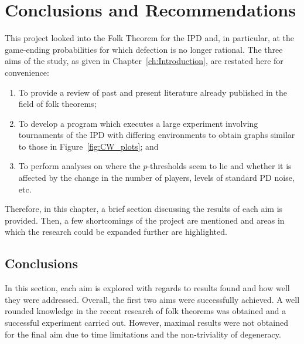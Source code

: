 \chapter{Conclusions and Recommendations}\label{ch:Conclusions}
This project looked into the Folk Theorem for the IPD and, in particular, at the
game-ending probabilities for which defection is no longer rational. The three
aims of the study, as given in Chapter~\ref{ch:Introduction}, are restated here for
convenience:

\begin{enumerate}
    \item To provide a review of past and present literature already published in
    the field of folk theorems;
    
    \item To develop a program which executes a large experiment involving
    tournaments of the IPD with differing environments to obtain
    graphs similar to those in Figure~\ref{fig:CW_plots}; and
    
    \item To perform analyses on where the \(p\)-thresholds seem to lie and
    whether it is affected by the change in the number of players, levels of
    standard PD noise, etc.
\end{enumerate}

Therefore, in this chapter, a brief section discussing the results of each aim
is provided. Then, a few shortcomings of the project are mentioned and areas in
which the research could be expanded further are highlighted.

\section{Conclusions}\label{sec:Conclusions}
In this section, each aim is explored with regards to results found and how well they were addressed. Overall, the first two aims were
successfully achieved. A well rounded knowledge in the recent research of
folk theorems was obtained and a successful experiment carried out. However,
maximal results were not obtained for the final aim due to time limitations and
the non-triviality of degeneracy.

